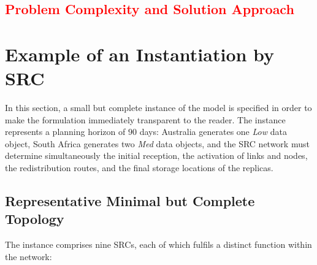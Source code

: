 \documentclass[a4paper,fleqn]{cas-dc}
\begin{document}
\subsection{\textcolor{red}{Problem Complexity and Solution Approach}}

\section{Example of an Instantiation by SRC}
\label{Instantiation}

In this section, a small but complete instance of the model is specified in order to make the formulation immediately transparent to the reader. The instance represents a planning horizon of \(90\) days: Australia generates one \emph{Low} data object, South Africa generates two \emph{Med} data objects, and the SRC network must determine simultaneously the initial reception, the activation of links and nodes, the redistribution routes, and the final storage locations of the replicas.


\subsection{Representative Minimal but Complete Topology}

The instance comprises nine SRCs, each of which fulfils a distinct function within the network:
\end{document}
